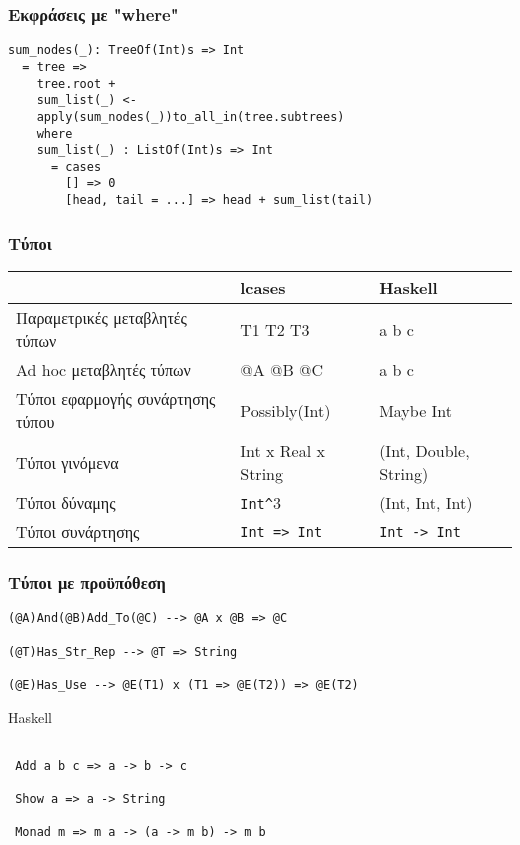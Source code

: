 \documentclass{beamer}
\def\e{\foreignlanguage{english}}
\def\h{\e{Haskell}}
\begin{document}
\begin{frame}[fragile]

\frametitle{Εκφράσεις με \e{"where"}}

\begin{otherlanguage}{english}
\begin{verbatim}
sum_nodes(_): TreeOf(Int)s => Int
  = tree =>
    tree.root +
    sum_list(_) <-
    apply(sum_nodes(_))to_all_in(tree.subtrees)
    where
    sum_list(_) : ListOf(Int)s => Int
      = cases
        [] => 0
        [head, tail = ...] => head + sum_list(tail)

\end{verbatim}
\end{otherlanguage}

\end{frame}

\begin{frame}

\frametitle{Τύποι}

\begin{center}
\begin{tabular}{ |M{2.5cm}|M{3cm}|M{4.3cm}| }
 \hline
 & \e{lcases} & \h
 \\
 \hline
 Παραμετρικές μεταβλητές τύπων & T1 T2 T3 & \e{a b c}
 \\
 \hline
 \e{Ad hoc} μεταβλητές τύπων & \e{@A @B @C} & \e{a b c}
 \\
 \hline
 Τύποι εφαρμογής συνάρτησης τύπου & \e{Possibly(Int)} & \e{Maybe Int}
 \\
 \hline
 Τύποι γινόμενα & \e{Int x Real x String} & \e{(Int, Double, String)}
 \\
 \hline
 Τύποι δύναμης & \e{\texttt{Int\^}}\e{3} & \e{(Int, Int, Int)}
 \\
 \hline
 Τύποι συνάρτησης & \e{\texttt{Int => Int}} & \e{\texttt{Int -> Int}}
 \\
 \hline
\end{tabular}
\end{center}

\end{frame}

\begin{frame}[fragile]

\frametitle{Τύποι με προϋπόθεση}

\begin{otherlanguage}{english}
\begin{verbatim}
(@A)And(@B)Add_To(@C) --> @A x @B => @C

(@T)Has_Str_Rep --> @T => String

(@E)Has_Use --> @E(T1) x (T1 => @E(T2)) => @E(T2)

\end{verbatim}
\h
\begin{verbatim}

 Add a b c => a -> b -> c

 Show a => a -> String

 Monad m => m a -> (a -> m b) -> m b
\end{verbatim}
\end{otherlanguage}

\end{frame}
\end{document}
